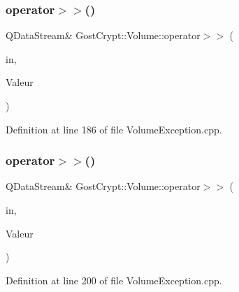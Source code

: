 \subsubsection{\texorpdfstring{operator$>$$>$()}{operator>>()}\hspace{0.1cm}{\footnotesize\ttfamily [13/19]}}
{\footnotesize\ttfamily Q\+Data\+Stream\& Gost\+Crypt\+::\+Volume\+::operator$>$$>$ (\begin{DoxyParamCaption}\item[{Q\+Data\+Stream \&}]{in,  }\item[{\hyperlink{class_gost_crypt_1_1_volume_1_1_failed_get_sector_size}{Gost\+Crypt\+::\+Volume\+::\+Failed\+Get\+Sector\+Size} \&}]{Valeur }\end{DoxyParamCaption})}



Definition at line 186 of file Volume\+Exception.\+cpp.

\mbox{\label{namespace_gost_crypt_1_1_volume_a715871574235b152aafca7fc6ee054ff}} 
\subsubsection{\texorpdfstring{operator$>$$>$()}{operator>>()}\hspace{0.1cm}{\footnotesize\ttfamily [14/19]}}
{\footnotesize\ttfamily Q\+Data\+Stream\& Gost\+Crypt\+::\+Volume\+::operator$>$$>$ (\begin{DoxyParamCaption}\item[{Q\+Data\+Stream \&}]{in,  }\item[{\hyperlink{class_gost_crypt_1_1_volume_1_1_failed_reset_timestamps}{Gost\+Crypt\+::\+Volume\+::\+Failed\+Reset\+Timestamps} \&}]{Valeur }\end{DoxyParamCaption})}



Definition at line 200 of file Volume\+Exception.\+cpp.

\mbox{\label{namespace_gost_crypt_1_1_volume_a0dc54a56ec153c7b24658324297306f8}} 
